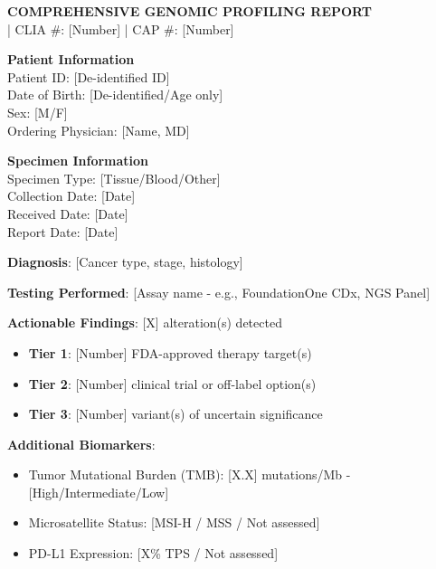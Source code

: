 \documentclass[10pt,letterpaper]{article}
\begin{document}
\begin{center}
{\fontsize{14}{16}\selectfont\bfseries\color{headerblue} COMPREHENSIVE GENOMIC PROFILING REPORT}\\[2pt]
{\fontsize{10}{12} | CLIA \#: [Number] | CAP \#: [Number]}
\end{center}

\vspace{2pt}

\begin{tcolorbox}[colback=highlightgray,colframe=black]
\begin{minipage}{0.48\textwidth}
{\small
\textbf{Patient Information}\\
Patient ID: [De-identified ID]\\
Date of Birth: [De-identified/Age only]\\
Sex: [M/F]\\
Ordering Physician: [Name, MD]
}
\end{minipage}
\hfill
\begin{minipage}{0.48\textwidth}
{\small
\textbf{Specimen Information}\\
Specimen Type: [Tissue/Blood/Other]\\
Collection Date: [Date]\\
Received Date: [Date]\\
Report Date: [Date]
}
\end{minipage}
\end{tcolorbox}

\vspace{2pt}

\textbf{Diagnosis}: [Cancer type, stage, histology]

\textbf{Testing Performed}: [Assay name - e.g., FoundationOne CDx, NGS Panel]

\vspace{2pt}

\begin{tcolorbox}[enhanced,colback=tier1green!10,colframe=tier1green,
title=\textbf{RESULTS SUMMARY},fonttitle=\bfseries,coltitle=black]
{\small
\textbf{Actionable Findings}: [X] alteration(s) detected
\begin{itemize}
\item \textbf{Tier 1}: [Number] FDA-approved therapy target(s)
\item \textbf{Tier 2}: [Number] clinical trial or off-label option(s)
\item \textbf{Tier 3}: [Number] variant(s) of uncertain significance
\end{itemize}

\textbf{Additional Biomarkers}:
\begin{itemize}
\item Tumor Mutational Burden (TMB): [X.X] mutations/Mb - [High/Intermediate/Low]
\item Microsatellite Status: [MSI-H / MSS / Not assessed]
\item PD-L1 Expression: [X\% TPS / Not assessed]
\end{itemize}
}
\end{tcolorbox}
\end{document}
